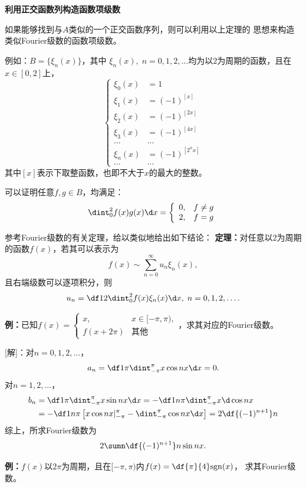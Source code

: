 \begin{shaded}
	{\bf 利用正交函数列构造函数项级数}
	
	如果能够找到与$A$类似的一个正交函数序列，则可以利用以上定理的
	思想来构造类似Fourier级数的函数项级数。
	
	例如：$B=\{\xi_n(x)\}$，其中
	$\xi_n(x),\;n=0,1,2,\ldots$均为以$2$为周期的函数，且在$x\in[0,2]$上，
	$$
		\left\{\begin{array}{rl}
			\xi_0(x)&=1\\
			\xi_1(x)&=(-1)^{[x]}\\
			\xi_2(x)&=(-1)^{[2x]}\\
			\xi_3(x)&=(-1)^{[4x]}\\
			\ldots&\ldots\\
			\xi_n(x)&=(-1)^{[2^nx]}\\
			\ldots&\ldots
		\end{array}\right.
	$$
	其中$[x]$表示下取整函数，也即不大于$x$的最大的整数。
	
	可以证明任意$f,g\in B$，均满足：
	$$\dint_0^{2}f(x)g(x)\d x=
	\left\{\begin{array}{ll}
		0,& f\ne g\\ 2,& f=g
	\end{array}\right.$$
	
	参考Fourier级数的有关定理，给以类似地给出如下结论：
	{\bf 定理：}对任意以$2$为周期的函数$f(x)$，若其可以表示为
	$$f(x)\sim\sum\limits_{n=0}^{\infty}u_n\xi_n(x),$$
	且右端级数可以逐项积分，则
	$$
	u_n=\df12\dint_0^2f(x)\xi_n(x)\d x,\;n=0,1,2,\ldots.
	$$
\end{shaded}

{\bf 例：}已知$f(x)=\left\{\begin{array}{ll}
	x,& x\in[-\pi,\pi),\\ f(x+2\pi)& \mbox{其他}
\end{array}\right.$，求其对应的Fourier级数。

[解]：对$n=0,1,2,\ldots$，
$$a_n=\df1{\pi}\dint_{-\pi}^{\pi}x\cos nx\d x=0.$$
对$n=1,2,\ldots$，
\begin{align*}
	b_n&=\df1{\pi}\dint_{-\pi}^{\pi}x\sin nx\d x
	=-\df1{n\pi}\dint_{-\pi}^{\pi}x\d\cos nx\\
	&=-\df1{n\pi}\left[x\cos nx|_{-\pi}^{\pi}
	-\dint_{-\pi}^{\pi}\cos nx\d x\right]=2\df{(-1)^{n+1}}n
\end{align*}
综上，所求Fourier级数为
$$2\sumn\df{(-1)^{n+1}}n\sin nx.$$

{\bf 例：}$f(x)$以$2\pi$为周期，且在$[-\pi,\pi)$内$f(x)=\df{\pi}{4}\mathrm{sgn}(x)$，
求其Fourier级数。

